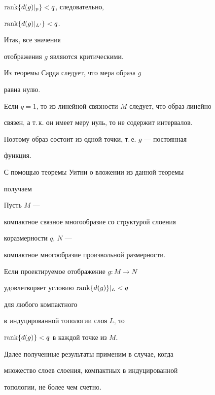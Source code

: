 $\operatorname{rank}\{ d(g)|_p\} < q$, следовательно,


$\operatorname{rank}\{ d(g)|_{L'}\} < q$.


Итак, все значения


отображения $g$ являются критическими.


Из теоремы Сарда следует, что мера образа $g$


равна нулю.





Если $q=1$, то из линейной связности $M$ следует, что образ линейно


связен, а т.\,к. он имеет меру нуль, то не содержит интервалов.


Поэтому образ состоит из одной точки, т.\,е. $g$ --- постоянная


функция.


\medskip





С помощью теоремы Уитни о вложении из данной теоремы


получаем





\begin{cor} \label{}


Пусть $M$ ---


компактное связное многообразие со структурой слоения


коразмерности $q$, $N$ ---


компактное многообразие произвольной размерности.


Если проектируемое отображение $g : M \to N$


удовлетворяет условию $\operatorname{rank}\{ d(g)\} |_L < q$


для любого компактного


в индуцированной топологии слоя $L$, то


$\operatorname{rank}\{ d(g)\} < q$ в каждой точке из $M$.


\end{cor}





Далее полученные результаты применим в случае, когда


множество слоев слоения, компактных в индуцированной


топологии, не более чем счетно.





